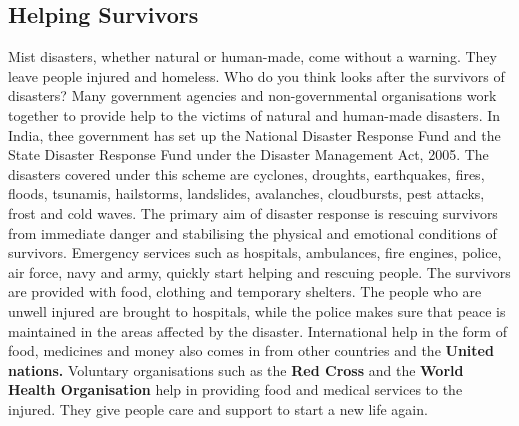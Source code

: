 \subsection{Helping Survivors}
Mist disasters, whether natural or human-made, come without a warning. They leave people injured and homeless. Who do you think looks after the survivors of disasters? Many government agencies and non-governmental organisations work together to provide help to the victims of natural and human-made disasters. In India, thee government has set up the National Disaster Response Fund and the State Disaster Response Fund under the Disaster Management Act, 2005. The disasters covered under this scheme are cyclones, droughts, earthquakes, fires, floods, tsunamis, hailstorms, landslides, avalanches, cloudbursts, pest attacks, frost and cold waves. The primary aim of disaster response is rescuing survivors from immediate danger and stabilising the physical and emotional conditions of survivors. Emergency services such as hospitals, ambulances, fire engines, police, air force, navy and army, quickly start helping and rescuing people. The survivors are provided with food, clothing and temporary shelters. The people who are unwell injured are brought to hospitals, while the police makes sure that peace is maintained in the areas affected by the disaster. International help in the form of food, medicines and money also comes in from other countries and the \textbf{United nations.} Voluntary organisations such as the \textbf{Red Cross} and the \textbf{World Health Organisation} help in providing food and medical services to the injured. They give people care and support to start a new life again.
\vspace{2.8in}
